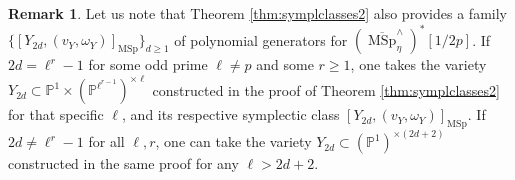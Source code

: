 \documentclass[10pt]{amsart}
\theoremstyle{definition}
\newtheorem{rmk}[defn]{Remark}
\theoremstyle{plain}
\numberwithin{equation}{section}
\newcommand{\0}{\emptyset}
\renewcommand{\P}{{\mathbb P}}
\newcommand{\MSp}{{\operatorname{MSp}}}
\begin{document}
\begin{rmk}
    Let us note that Theorem \ref{thm:symplclasses2} also provides a family $\{[Y_{2d}, (v_Y,\omega_Y)]_\MSp\}_{d\ge 1}$ of polynomial generators for $({\overline{\MSp}^\wedge_\eta})^*[1/2p]$. If $2d=\ell^r-1$ for some odd prime $\ell \neq p$ and some $r \ge 1$, one takes the variety $Y_{2d} \subset \P^1 \times (\P^{\ell^{r-1}})^{\times \ell}$ constructed in the proof of Theorem \ref{thm:symplclasses2} for that specific $\ell$, and its respective symplectic class $[Y_{2d}, (v_Y,\omega_Y)]_\MSp$. If $2d \neq \ell^r-1$ for all $\ell,r$, one can take the variety $Y_{2d}\subset (\P^1)^{\times (2d+2)}$ constructed in the same proof for any $\ell > 2d+2$.
\end{rmk}

\printbibliography
\end{document}
